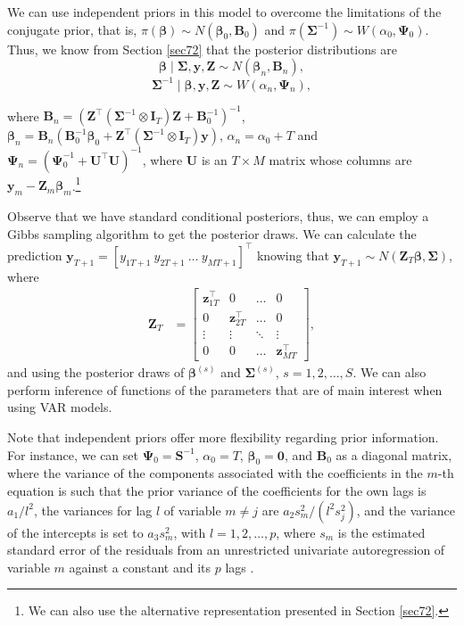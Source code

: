 We can use independent priors in this model to overcome the limitations of the conjugate prior, that is, $\pi(\bm{\beta})\sim{N}(\bm{\beta}_0,\bm{B}_0)$ and $\pi(\bm{\Sigma}^{-1})\sim{W}(\alpha_0,\bm{\Psi}_0)$. Thus, we know from Section \ref{sec72} that the posterior distributions are
\begin{equation*}
	\bm{\beta}\mid \bm{\Sigma}, \bm{y}, \bm{Z} \sim {N}(\bm{\beta}_n, \bm{B}_n), 
\end{equation*}
\begin{equation*}
	\bm{\Sigma}^{-1}\mid \bm{\beta}, \bm{y}, \bm{Z} \sim {W}(\alpha_n, \bm{\Psi}_n),
\end{equation*}

where $\bm{B}_n=(\bm{Z}^{\top}(\bm{\Sigma}^{-1}\otimes \bm{I}_T )\bm{Z}+\bm{B}_0^{-1})^{-1}$, $\bm{\beta}_n=\bm{B}_n(\bm{B}_0^{-1}\bm{\beta}_0 + \bm{Z}^{\top}(\bm{\Sigma}^{-1}\otimes \bm{I}_T)\bm{y})$, $\alpha_n = \alpha_0 + T$ and $\bm{\Psi}_n = (\bm{\Psi}_0^{-1} + \bm{U}^{\top}\bm{U})^{-1}$, where $\bm{U}$ is an $T\times M$ matrix whose columns are $\bm{y}_m-\bm{Z}_m\bm{\beta}_m$.\footnote{We can also use the alternative representation presented in Section \ref{sec72}.}

Observe that we have standard conditional posteriors, thus, we can employ a Gibbs sampling algorithm to get the posterior draws. We can calculate the prediction $\bm{y}_{T+1}=[y_{1T+1} \ y_{2T+1} \ \dots \ y_{MT+1}]^{\top}$ knowing that $\bm{y}_{T+1}\sim N(\bm{Z}_{T}\bm{\beta},\bm{\Sigma})$, where \begin{align*}
	\bm{Z}_T&=\begin{bmatrix}
		\bm{z}_{1T}^{\top} & 0 & \dots & 0\\
		0 & \bm{z}_{2T}^{\top} & \dots & 0\\
		\vdots & \vdots & \ddots & \vdots\\
		0 & 0& \dots & \bm{z}_{MT}^{\top}		
	\end{bmatrix},
\end{align*} 
and using the posterior draws of $\bm{\beta}^{(s)}$ and $\bm{\Sigma}^{(s)}$, $s=1,2,\dots,S$. We can also perform inference of functions of the parameters that are of main interest when using VAR models.

Note that independent priors offer more flexibility regarding prior information. For instance, we can set $\bm{\Psi}_0 = \bm{S}^{-1}$, $\alpha_0 = T$, $\bm{\beta}_0 = \bm{0}$, and $\bm{B}_0$ as a diagonal matrix, where the variance of the components associated with the coefficients in the $m$-th equation is such that the prior variance of the coefficients for the own lags is $a_1/l^2$, the variances for lag $l$ of variable $m \neq j$ are $a_2s_{m}^2/(l^2 s_{j}^2)$, and the variance of the intercepts is set to $a_3 s_{m}^2$, with $l = 1, 2, \dots, p$, where $s_m$ is the estimated standard error of the residuals from an unrestricted univariate autoregression of variable $m$ against a constant and its $p$ lags \cite{litterman1986forecasting, koop2010bayesian}. 

